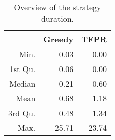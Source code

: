 \begin{table}[ht]
\centering
\begin{tabular}{rrr}
  \hline
 & Greedy & TFPR \\ 
  \hline
Min. & 0.03 & 0.00 \\ 
  1st Qu. & 0.06 & 0.00 \\ 
  Median & 0.21 & 0.60 \\ 
  Mean & 0.68 & 1.18 \\ 
  3rd Qu. & 0.48 & 1.34 \\ 
  Max. & 25.71 & 23.74 \\ 
   \hline
\end{tabular}
\caption{Overview of the strategy duration.} 
\label{tab:results:rq0:summary:duration}
\end{table}
